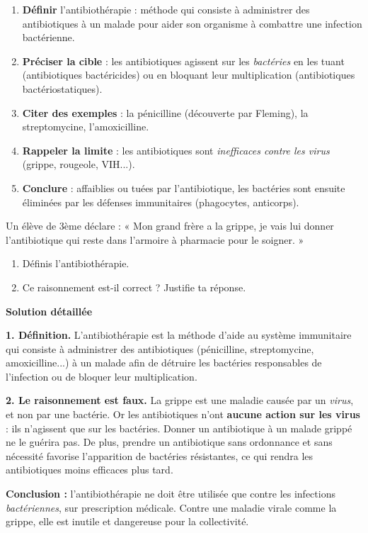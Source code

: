 \documentclass[11pt]{article}
\newcommand{\cle}[1]{{\popxbold\color{popdark}#1}}
\begin{document}
\begin{methode}
\begin{enumerate}
\item \textbf{Définir} l'antibiothérapie : méthode qui consiste à administrer des antibiotiques à un malade pour aider son organisme à combattre une infection bactérienne.
\item \textbf{Préciser la cible} : les antibiotiques agissent sur les \emph{bactéries} en les tuant (antibiotiques bactéricides) ou en bloquant leur multiplication (antibiotiques bactériostatiques).
\item \textbf{Citer des exemples} : la pénicilline (découverte par Fleming), la streptomycine, l'amoxicilline.
\item \textbf{Rappeler la limite} : les antibiotiques sont \emph{inefficaces contre les virus} (grippe, rougeole, VIH...).
\item \textbf{Conclure} : affaiblies ou tuées par l'antibiotique, les bactéries sont ensuite éliminées par les défenses immunitaires (phagocytes, anticorps).
\end{enumerate}
\end{methode}

\begin{exoresolu}
Un élève de 3ème déclare : « Mon grand frère a la grippe, je vais lui donner l'antibiotique qui reste dans l'armoire à pharmacie pour le soigner. »
\begin{enumerate}
\item Définis l'antibiothérapie.
\item Ce raisonnement est-il correct ? Justifie ta réponse.
\end{enumerate}
\tcblower
\textbf{Solution détaillée}

\textbf{1. Définition.} L'\cle{antibiothérapie} est la méthode d'aide au système immunitaire qui consiste à administrer des \cle{antibiotiques} (pénicilline, streptomycine, amoxicilline...) à un malade afin de détruire les bactéries responsables de l'infection ou de bloquer leur multiplication.

\textbf{2. Le raisonnement est faux.} La grippe est une maladie causée par un \emph{virus}, et non par une bactérie. Or les antibiotiques n'ont \textbf{aucune action sur les virus} : ils n'agissent que sur les bactéries. Donner un antibiotique à un malade grippé ne le guérira pas. De plus, prendre un antibiotique sans ordonnance et sans nécessité favorise l'apparition de bactéries résistantes, ce qui rendra les antibiotiques moins efficaces plus tard.

\textbf{Conclusion :} l'antibiothérapie ne doit être utilisée que contre les infections \emph{bactériennes}, sur prescription médicale. Contre une maladie virale comme la grippe, elle est inutile et dangereuse pour la collectivité.
\end{exoresolu}
\end{document}
